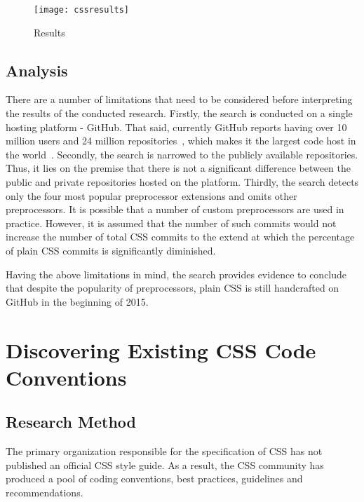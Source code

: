 \documentclass[parskip=full]{uvamscse}
\begin{document}
\begin{figure}[h!]
  \centering
  \caption{Results}
  \label{cssresults}
  \texttt{[image: cssresults]}
\end{figure}

\section{Analysis}

There are a number of limitations that need to be considered before interpreting the results of the
conducted research. Firstly, the search is conducted on a single hosting platform - GitHub. That
said, currently GitHub reports having over 10 million users and 24 million
repositories~\cite{GitHub}, which makes it the largest code host in the
world~\cite{gousios2014lean}. Secondly, the search is narrowed to the publicly available
repositories. Thus, it lies on the premise that there is not a significant difference between the
public and private repositories hosted on the platform. Thirdly, the search detects only the four
most popular preprocessor extensions and omits other preprocessors. It is possible that a number of
custom preprocessors are used in practice. However, it is assumed that the number of such commits
would not increase the number of total CSS commits to the extend at which the percentage of plain
CSS commits is significantly diminished.

Having the above limitations in mind, the search provides evidence to conclude that despite the
popularity of preprocessors, plain CSS is still handcrafted on GitHub in the beginning of 2015.


\chapter{Discovering Existing CSS Code Conventions}
\label{sec:discovering}

\section{Research Method}

The primary organization responsible for the specification of CSS has not published an official CSS
style guide. As a result, the CSS community has produced a pool of coding conventions, best
practices, guidelines and recommendations.
\end{document}
